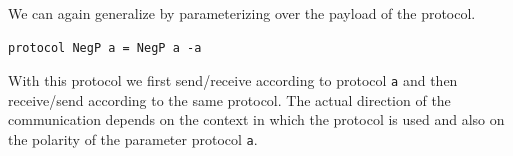   We can again generalize by parameterizing over the payload of the protocol.
\begin{lstlisting}
protocol NegP a = NegP a -a
\end{lstlisting}
  With this protocol we first send/receive according to protocol \lstinline{a}
  and then receive/send according to the same protocol. The actual
  direction of  the communication depends on the context in which the
  protocol is used and also on the polarity of the parameter protocol
  \lstinline{a}.

